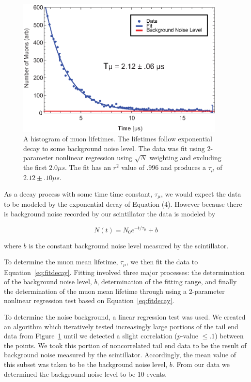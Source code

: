 \begin{figure}[htbp]
\begin{center}
\includegraphics[height=70mm]{./figures/muon_decay.eps}
\caption{A histogram of muon lifetimes. The lifetimes follow exponential decay to some background noise level.  The data was fit using 2-parameter nonlinear regression using $\sqrt{N}$ weighting and excluding the first $2.0 \mu s$.  The fit has an $r^{2}$ value of $.996$ and produces a $\tau_{\mu}$ of $2.12 \pm .10 \mu s$.}
\label{fig:muondecay}
\end{center}
\end{figure}

 As a decay process with some time time constant, $\tau_{\mu}$, we
would expect the data to be modeled by the exponential decay of Equation
(4).  However because there is background noise recorded by our
scintillator the data is modeled by

\begin{equation}
\label{eq:fitdecay}
N(t) = N_{0} e^{-t/\tau_{\mu}}+b
\end{equation}

where $b$ is the constant background noise level measured by the scintillator. 

To determine the muon mean lifetime, $\tau_{\mu}$, we then fit the
data to Equation~\eqref{eq:fitdecay}.  Fitting involved three major processes: the
determination of the background noise level, $b$, determination of the
fitting range, and finally the determination of the muon mean lifetime
through using a 2-parameter nonlinear regression test based on Equation~\eqref{eq:fitdecay}.

To determine the noise background, a linear regression test was used.
We created an algorithm which iteratively tested increasingly large
portions of the tail end data from Figure~\ref{fig:muondecay} until we detected a
slight correlation ($p$-value $\leq .1$) between the points.  We took
this portion of noncorrelated tail end data to be the result of
background noise measured by the scintillator.  Accordingly, the mean
value of this subset was taken to be the background noise level,
$b$. From our data we determined the background noise level to be 10
events.


